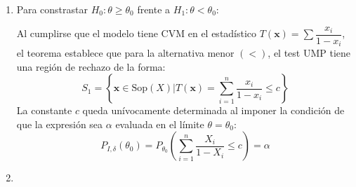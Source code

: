 \begin{enumerate}[label=\color{red}\textbf{\arabic*)}]
\begin{enumerate}[label=\color{red}\textbf{\alph*)}]
\begin{enumerate}[label=\arabic*)]
			                  Reescribimos la función para identificar si pertenece a la familia exponencial uniparamétrica: \[
				                  L(\mathbf{x};\theta)=\exp\left\{ -\dfrac{1}{\theta}\sum_{i=1}^{n} \dfrac{x_{i}}{1-x_{i}}-n\ln(\theta)-2 \sum_{i=1}^{n} \ln(1-x_{i}) \right\}
			                  \]
			                  Esta expresión tiene la forma $L(\mathbf{x};\theta)=\exp \{A(\theta)T(\mathbf{x})+B(\theta)+h(\mathbf{x})\} $, donde:
			                  \begin{itemize}[label=\textbullet]
				                  \item $A(\theta)=-\dfrac{1}{\theta}$
				                  \item $T(\mathbf{x})=\sum_{i=1}^{n} \dfrac{x_{i}}{1-x_{i}}$
			                  \end{itemize}
			            \item Condición de Monotonía:

			                  Calculamos la derivada de $A(\theta)$:  \[
				                  A'(\theta)=\dfrac{1}{\theta^2}>0\text{ para todo }\theta>0
			                  \]
			                  Dado que $A(\theta)$ es una función estrictamente creciente, la variable  $X$ tiene un  \textbf{Cociente de Verosimilitud Monótono} en el estadístico $T(\mathbf{x})=\sum_{i=1}^{n} \dfrac{x_{i}}{1-x_{i}}$.
		            \end{enumerate}
		      \item {}

		            Para constrastar $H_0:\theta\ge \theta_0$ frente a $H_1:\theta<\theta_0$:

		            Al cumplirse que el modelo tiene CVM en el estadístico $T(\mathbf{x})=\sum \dfrac{x_{i}}{1-x_{i}}$, el teorema establece que para la alternativa menor $(<)$, el test UMP tiene una región de rechazo de la forma:  \[
			            S_1=\left\{ \mathbf{x}\in \mathrm{Sop}(X)\bigg| T(\mathbf{x})=\sum_{i=1}^{n} \dfrac{x_{i}}{1-x_{i}}\le c \right\}
		            \]
		            La constante $c$ queda unívocamente determinada al imponer la condición de que la expresión sea  $\alpha$ evaluada en el límite $\theta=\theta_0$: \[
			            P_{I,\delta}(\theta_0)=P_{\theta_0}\left( \sum_{i=1}^{n} \dfrac{X_i}{1-X_i}\le c \right) =\alpha
		            \]
		      \item {}


\end{enumerate}
\end{enumerate}
